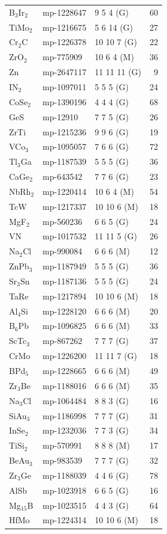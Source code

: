 \begin{longtable}{@{}l l l r@{}}
B$_{3}$Ir$_{2}$ & mp-1228647 & 9 5 4 (G) & 60 \\
TiMo$_{2}$ & mp-1216675 & 5 6 14 (G) & 27 \\
Cr$_{2}$C & mp-1226378 & 10 10 7 (G) & 22 \\
ZrO$_{2}$ & mp-775909 & 10 6 4 (M) & 36 \\
Zn & mp-2647117 & 11 11 11 (G) & 9 \\
IN$_{2}$ & mp-1097011 & 5 5 5 (G) & 24 \\
CoSe$_{2}$ & mp-1390196 & 4 4 4 (G) & 68 \\
GeS & mp-12910 & 7 7 5 (G) & 26 \\
ZrTi & mp-1215236 & 9 9 6 (G) & 19 \\
VCo$_{3}$ & mp-1095057 & 7 6 6 (G) & 72 \\
Tl$_{3}$Ga & mp-1187539 & 5 5 5 (G) & 36 \\
CaGe$_{2}$ & mp-643542 & 7 7 6 (G) & 23 \\
NbRh$_{2}$ & mp-1220414 & 10 6 4 (M) & 54 \\
TcW & mp-1217337 & 10 10 6 (M) & 18 \\
MgF$_{2}$ & mp-560236 & 6 6 5 (G) & 24 \\
VN & mp-1017532 & 11 11 5 (G) & 26 \\
Na$_{2}$Cl & mp-990084 & 6 6 6 (M) & 12 \\
ZnPb$_{3}$ & mp-1187949 & 5 5 5 (G) & 36 \\
Sr$_{3}$Sn & mp-1187136 & 5 5 5 (G) & 24 \\
TaRe & mp-1217894 & 10 10 6 (M) & 18 \\
Al$_{4}$Si & mp-1228120 & 6 6 6 (M) & 20 \\
B$_{6}$Pb & mp-1096825 & 6 6 6 (M) & 33 \\
ScTc$_{3}$ & mp-867262 & 7 7 7 (G) & 37 \\
CrMo & mp-1226200 & 11 11 7 (G) & 18 \\
BPd$_{5}$ & mp-1228665 & 6 6 6 (M) & 49 \\
Zr$_{3}$Be & mp-1188016 & 6 6 6 (M) & 35 \\
Na$_{3}$Cl & mp-1064484 & 8 8 3 (G) & 16 \\
SiAu$_{3}$ & mp-1186998 & 7 7 7 (G) & 31 \\
InSe$_{2}$ & mp-1232036 & 7 7 3 (G) & 34 \\
TiSi$_{2}$ & mp-570991 & 8 8 8 (M) & 17 \\
BeAu$_{3}$ & mp-983539 & 7 7 7 (G) & 32 \\
Zr$_{3}$Ge & mp-1188039 & 4 4 6 (G) & 78 \\
AlSb & mp-1023918 & 6 6 5 (G) & 16 \\
Mg$_{15}$B & mp-1023515 & 4 4 3 (G) & 64 \\
HfMo & mp-1224314 & 10 10 6 (M) & 18 \\
\midrule
\end{longtable}